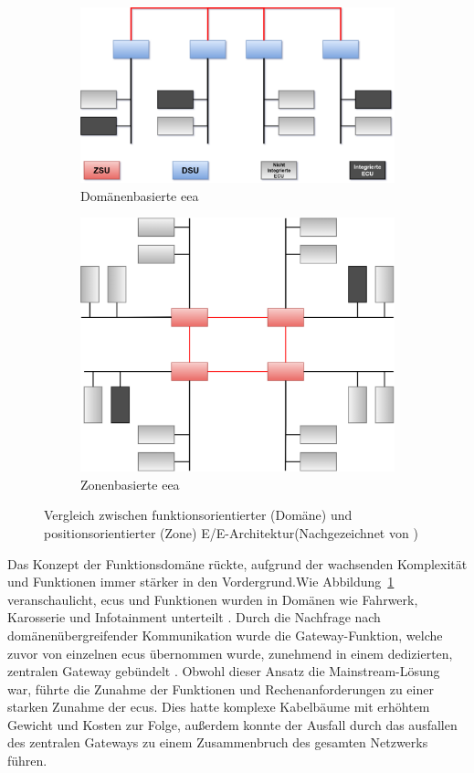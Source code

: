 \begin{figure}[h!]
  \centering
  \begin{subfigure}{.5\textwidth}
    \centering
    \includegraphics[width=\linewidth]{figures/02Grundlagen/Domainbasiert.drawio.png}
    \caption{Domänenbasierte \gls{eea}}
    \label{fig:deea}
  \end{subfigure}%
  \begin{subfigure}{.5\textwidth}
    \centering
    \includegraphics[width=.75\linewidth]{figures/02Grundlagen/Zonenbasiert.drawio.png}
    \caption{Zonenbasierte \gls{eea}}
    \label{fig:zeea}
  \end{subfigure}
  \caption{Vergleich zwischen funktionsorientierter (Domäne) und positionsorientierter (Zone) E/E-Architektur(Nachgezeichnet von \cite{wang2024review})}
  \label{fig:eea}
\end{figure}


Das Konzept der Funktionsdomäne rückte, aufgrund der wachsenden Komplexität und Funktionen immer stärker in den Vordergrund.Wie Abbildung~\ref{fig:deea} veranschaulicht, \glspl{ecu} und Funktionen wurden in Domänen wie Fahrwerk, Karosserie und Infotainment unterteilt \cite{jiang2019vehicle}. Durch die Nachfrage nach domänenübergreifender Kommunikation wurde die Gateway-Funktion, welche zuvor von einzelnen \glspl{ecu} übernommen wurde, zunehmend in einem dedizierten, zentralen Gateway gebündelt \cite{jiang2019vehicle}\cite{zhuRequirementsDrivenAutomotiveElectrical2021}.
Obwohl dieser Ansatz die Mainstream-Lösung war, führte die Zunahme der Funktionen und Rechenanforderungen zu einer starken Zunahme der \glspl{ecu}. Dies hatte komplexe Kabelbäume mit erhöhtem Gewicht und Kosten zur Folge, außerdem konnte der Ausfall durch das ausfallen des zentralen Gateways zu einem Zusammenbruch des gesamten Netzwerks führen.

